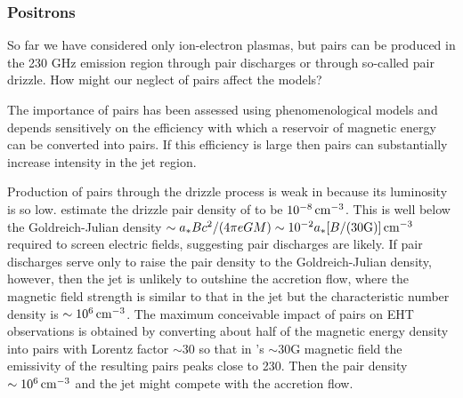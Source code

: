 \subsubsection{Positrons}\label{sec:pair}

So far we have considered only ion-electron plasmas, but pairs can be produced in the 230 GHz emission region through pair discharges or through so-called pair drizzle.  How might our neglect of pairs affect the models?

The importance of pairs has been assessed using phenomenological models \citep{2020ApJ...896...30A, 2021ApJ...923..272E} and depends sensitively on the efficiency with which a reservoir of magnetic energy can be converted into pairs.  If this efficiency is large then pairs can substantially increase intensity in the jet region.

Production of pairs through the drizzle process is weak in \sgra because its luminosity is so low.  \cite[][see also \citealt{2021ApJ...907...73W}]{2011ApJ...735....9M} estimate the drizzle pair density of \sgra to be $10^{-8}\,\mathrm{cm}^{-3}$.  This is well below the Goldreich-Julian density $\sim a_* B c^2/(4 \pi e G M) \sim 10^{-2} a_* [B/(30 {\rm G})] \,\mathrm{cm}^{-3}$ required to screen electric fields, suggesting pair discharges are likely.  If pair discharges serve only to raise the pair density to the Goldreich-Julian density, however, then the jet is unlikely to outshine the accretion flow, where the magnetic field strength is similar to that in the jet but the characteristic number density is $\sim 10^6 \,\mathrm{cm}^{-3}$.  The maximum conceivable impact of pairs on EHT observations is obtained by converting about half of the magnetic energy density into pairs with Lorentz factor $\sim 30$ so that in \sgra's $\sim 30$G magnetic field the emissivity of the resulting pairs peaks close to 230\GHz.  Then the pair density $\sim 10^{6} \,\mathrm{cm}^{-3}$ and the jet might compete with the accretion flow.



